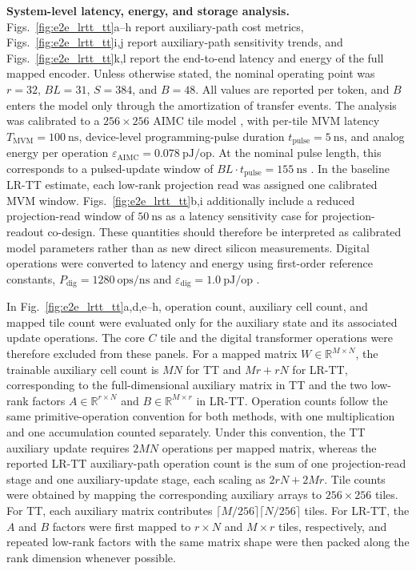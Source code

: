 \documentclass[fleqn,10pt]{wlscirep}
\begin{document}
\noindent\textbf{System-level latency, energy, and storage analysis.}
Figs.~\ref{fig:e2e_lrtt_tt}a--h report auxiliary-path cost metrics, Figs.~\ref{fig:e2e_lrtt_tt}i,j report auxiliary-path sensitivity trends, and Figs.~\ref{fig:e2e_lrtt_tt}k,l report the end-to-end latency and energy of the full mapped encoder. Unless otherwise stated, the nominal operating point was \(r=32\), \(BL=31\), \(S=384\), and \(B=48\). All values are reported per token, and \(B\) enters the model only through the amortization of transfer events. The analysis was calibrated to a \(256\times256\) AIMC tile model \cite{klein2023alpine}, with per-tile MVM latency \(T_{\mathrm{MVM}}=100~\mathrm{ns}\), device-level programming-pulse duration \(t_{\mathrm{pulse}}=5~\mathrm{ns}\), and analog energy per operation \(\varepsilon_{\mathrm{AIMC}}=0.078~\mathrm{pJ/op}\). At the nominal pulse length, this corresponds to a pulsed-update window of \(BL\cdot t_{\mathrm{pulse}}=155~\mathrm{ns}\) \cite{rasch2024fastrobust}. In the baseline LR-TT estimate, each low-rank projection read was assigned one calibrated MVM window. Figs.~\ref{fig:e2e_lrtt_tt}b,i additionally include a reduced projection-read window of \(50~\mathrm{ns}\) as a latency sensitivity case for projection-readout co-design. These quantities should therefore be interpreted as calibrated model parameters rather than as new direct silicon measurements. Digital operations were converted to latency and energy using first-order reference constants, \(P_{\mathrm{dig}}=1280~\mathrm{ops/ns}\) and \(\varepsilon_{\mathrm{dig}}=1.0~\mathrm{pJ/op}\) \cite{chen2025albertanalog,horowitz2014computing}.

\noindent
In Fig.~\ref{fig:e2e_lrtt_tt}a,d,e--h, operation count, auxiliary cell count, and mapped tile count were evaluated only for the auxiliary state and its associated update operations. The core \(C\) tile and the digital transformer operations were therefore excluded from these panels. For a mapped matrix \(W\in\mathbb{R}^{M\times N}\), the trainable auxiliary cell count is \(MN\) for TT and \(Mr+rN\) for LR-TT, corresponding to the full-dimensional auxiliary matrix in TT and the two low-rank factors \(A\in\mathbb{R}^{r\times N}\) and \(B\in\mathbb{R}^{M\times r}\) in LR-TT. Operation counts follow the same primitive-operation convention for both methods, with one multiplication and one accumulation counted separately. Under this convention, the TT auxiliary update requires \(2MN\) operations per mapped matrix, whereas the reported LR-TT auxiliary-path operation count is the sum of one projection-read stage and one auxiliary-update stage, each scaling as \(2rN+2Mr\). Tile counts were obtained by mapping the corresponding auxiliary arrays to \(256\times256\) tiles. For TT, each auxiliary matrix contributes \(\lceil M/256\rceil\lceil N/256\rceil\) tiles. For LR-TT, the \(A\) and \(B\) factors were first mapped to \(r\times N\) and \(M\times r\) tiles, respectively, and repeated low-rank factors with the same matrix shape were then packed along the rank dimension whenever possible.
\end{document}
